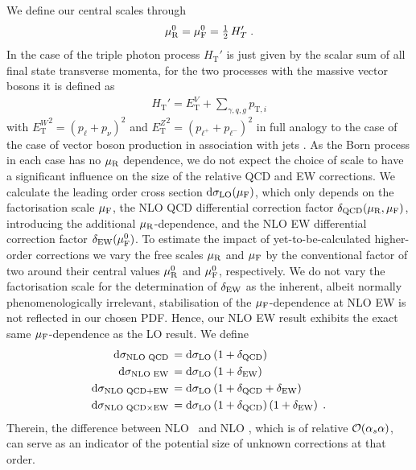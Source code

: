 We define our central scales through
\begin{equation}
  \label{eq:murfdef}
    \muR^0 = \muF^0 = %
      \tfrac{1}{2}\,H_T' \;. %
\end{equation}
In the case of the triple photon process $ H_\mathrm{T}' $ is just given by the scalar sum of all final state 
transverse momenta, for the two processes with the massive vector bosons it is defined as 
\begin{equation}
  \label{ew:defHT}
  \begin{split}
    H_\mathrm{T}' = E_\mathrm{T}^V + \sum_{\gamma,q,g} p_{\mathrm{T},i}
  \end{split}
\end{equation}
with $\left.E_\mathrm{T}^W\right.^2=(p_\ell+p_\nu)^2$ and 
$\left.E_\mathrm{T}^Z\right.^2=(p_{\ell^+}+p_{\ell^-})^2$ 
in full analogy to the case of the case of vector boson production 
in association with jets \cite{Berger:2009ep}.
As the Born process in each case has no $\mu_{\mathrm{R}}$ dependence, we 
do not expect the choice of scale to have a significant influence 
on the size of the relative QCD and EW corrections.
We calculate the leading order cross section $\mathrm{d}\sigma_\text{LO}(\mu_{\mathrm{F}})$, 
which only depends on the factorisation scale $\mu_{\mathrm{F}}$, the 
NLO QCD differential correction factor $\delta_\text{QCD}(\mu_{\mathrm{R}},\mu_{\mathrm{F}})$, 
introducing the additional $\mu_{\mathrm{R}}$-dependence, and the NLO EW 
differential correction factor $\delta_\text{EW}(\mu_{\mathrm{F}}^0)$. 
To estimate the impact of yet-to-be-calculated higher-order 
corrections we vary the free scales $\mu_{\mathrm{R}}$ and $\mu_{\mathrm{F}}$ 
by the conventional factor of two around their central values 
$\mu_{\mathrm{R}}^0$ and $\mu_{\mathrm{F}}^0$, respectively.
We do not vary the factorisation scale for the determination 
of $\delta_\text{EW}$ as the inherent, albeit normally phenomenologically 
irrelevant, stabilisation of the $\mu_{\mathrm{F}}$-dependence at NLO EW 
is not reflected in our chosen PDF.
Hence, our NLO EW result exhibits the exact same $\mu_{\mathrm{F}}$-dependence 
as the LO result.
We define 
\begin{equation}
  \label{eq:defnlo}
  \begin{split}
    \mathrm{d}\sigma_\text{NLO QCD}
    \,=\;&\mathrm{d}\sigma_\text{LO}\left(1+\delta_\text{QCD}\right)\\
    \mathrm{d}\sigma_\text{NLO EW}
    \,=\;&\mathrm{d}\sigma_\text{LO}\left(1+\delta_\text{EW}\right)\\
    \mathrm{d}\sigma_\text{NLO QCD+EW}
    \,=\;&\mathrm{d}\sigma_\text{LO}\left(1+\delta_\text{QCD}+\delta_\text{EW}\right)\\
    \mathrm{d}\sigma_\text{NLO QCD$\times$EW}
    \,=\;&\mathrm{d}\sigma_\text{LO}\left(1+\delta_\text{QCD}\right)\left(1+\delta_\text{EW}\right)\;.
  \end{split}
\end{equation}
Therein, the difference between NLO \QCDpEW\ and NLO \QCDtEW, which 
is of relative $\mathcal{O}(\alpha_s\alpha)$, can serve as an indicator 
of the potential size of unknown corrections at that order.

